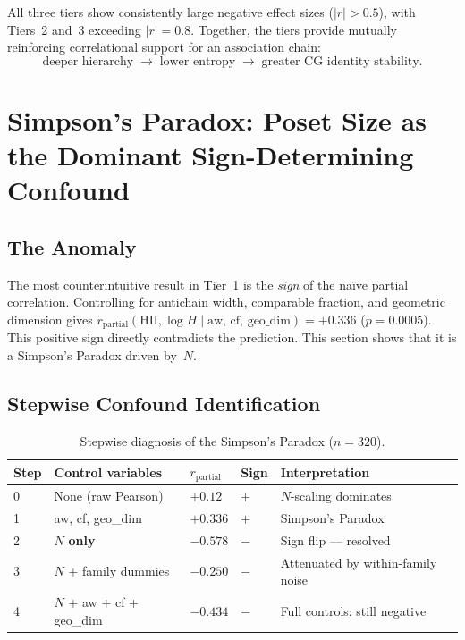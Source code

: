 \documentclass[entropy,article,submit,pdftex,moreauthors]{Definitions/mdpi}
\begin{document}
All three tiers show consistently large negative effect sizes ($|r| > 0.5$), with Tiers~2 and~3 exceeding $|r| = 0.8$. Together, the tiers provide mutually reinforcing correlational support for an association chain:
\begin{equation}
    \text{deeper hierarchy} \;\longrightarrow\; \text{lower entropy} \;\longrightarrow\; \text{greater CG identity stability.}
    \label{eq:chain_full}
\end{equation}

\section{Simpson's Paradox: Poset Size as the Dominant Sign-Determining Confound}\label{sec:simpson}

\subsection{The Anomaly}

The most counterintuitive result in Tier~1 is the \emph{sign} of the na\"ive partial correlation. Controlling for antichain width, comparable fraction, and geometric dimension gives $r_\text{partial}(\text{HII}, \log H \mid \text{aw, cf, geo\_dim}) = +0.336$ ($p = 0.0005$). This positive sign directly contradicts the prediction. This section shows that it is a Simpson's Paradox driven by~$N$.

\subsection{Stepwise Confound Identification}

\begin{table}[H]
\caption{Stepwise diagnosis of the Simpson's Paradox ($n = 320$).\label{tab:simpson}}
\begin{tabular}{lllll}
\toprule
\textbf{Step} & \textbf{Control variables} & \boldmath$r_\text{partial}$ & \textbf{Sign} & \textbf{Interpretation} \\
\midrule
0 & None (raw Pearson) & $+0.12$ & $+$ & $N$-scaling dominates \\
1 & aw, cf, geo\_dim & $+0.336$ & $+$ & Simpson's Paradox \\
2 & \boldmath$N$ \textbf{only} & $\mathbf{-0.578}$ & $\mathbf{-}$ & Sign flip --- resolved \\
3 & $N$ + family dummies & $-0.250$ & $-$ & Attenuated by within-family noise \\
4 & $N$ + aw + cf + geo\_dim & $-0.434$ & $-$ & Full controls: still negative \\
\bottomrule
\end{tabular}
\end{table}
\end{document}
